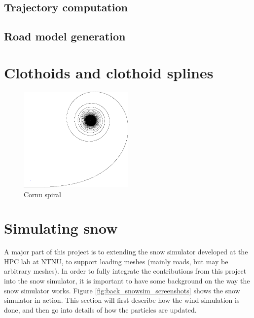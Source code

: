 \subsection{Trajectory computation}

\subsection{Road model generation}


\section{Clothoids and clothoid splines}

\begin{figure}[ht]
\centering
\includegraphics[width=0.5\textwidth]{figure/cornu}
\caption{Cornu spiral}
\label{fig:back_cornu}
\end{figure}

\section{Simulating snow}
A major part of this project is to extending the snow simulator developed at the HPC lab at NTNU, to support loading meshes (mainly roads, but may be arbitrary meshes). In order to fully integrate the contributions from this project into the snow simulator, it is important to have some background on the way the snow simulator works. Figure \ref{fig:back_snowsim_screenshots} shows the snow simulator in action. This section will first describe how the wind simulation is done, and then go into details of how the particles are updated. 

